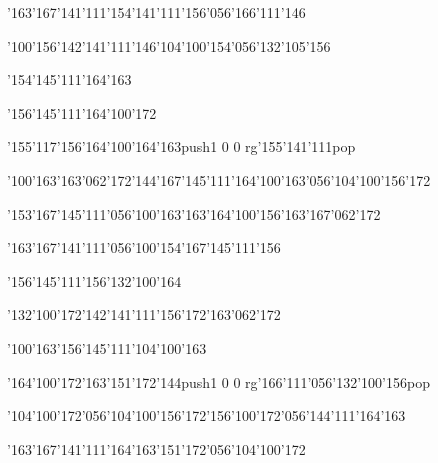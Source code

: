 \null\vfill\ipa\centerline{\enskip\enskip\enskip\enskip\char'163\char'167\char'141\char'111\enskip\enskip\enskip\enskip\char'154\char'141\char'111\char'156\char'056\char'166\char'111\char'146}\medskip\centerline{\enskip\char'100\char'156\enskip\char'142\char'141\char'111\char'146\enskip\char'104\char'100\char'154\char'056\char'132\char'105\char'156}\medskip\centerline{\enskip\enskip\enskip\enskip\enskip\enskip\char'154\char'145\char'111\char'164\char'163\enskip\enskip\enskip\enskip\enskip\enskip\enskip}\medskip\centerline{\enskip\enskip\enskip\enskip\char'156\char'145\char'111\enskip\enskip\enskip\enskip\char'164\char'100\char'172}\medskip\centerline{\enskip\char'155\char'117\char'156\enskip\char'164\char'100\char'164\char'163\enskip\enskip\enskip\enskip\enskip\enskip\pdfcolorstack\match push{1 0 0 rg}\char'155\char'141\char'111\pdfcolorstack\match pop{}\enskip\enskip\enskip\enskip\enskip\enskip}\medskip\centerline{\enskip\char'100\char'163\enskip\enskip\enskip\enskip\char'163\char'062\char'172\char'144\enskip\char'167\char'145\char'111\enskip\char'164\char'100\char'163\char'056\char'104\char'100\char'156\char'172}\medskip\centerline{\enskip\char'153\char'167\char'145\char'111\char'056\char'100\char'163\enskip\enskip\enskip\enskip\enskip\enskip\char'163\char'164\char'100\char'156\enskip\enskip\enskip\enskip\enskip\char'163\char'167\char'062\char'172}\medskip\vfill\footline{\hfil\tt\folio\hfil}\eject
\null\vfill\ipa\centerline{\enskip\enskip\enskip\enskip\char'163\char'167\char'141\char'111\char'056\char'100\char'154\enskip\char'167\char'145\char'111\char'156\enskip\enskip\enskip\enskip}\medskip\centerline{\enskip\enskip\enskip\enskip\char'156\char'145\char'111\char'156\enskip\char'132\char'100\char'164\enskip\enskip\enskip\enskip}\medskip\centerline{\enskip\enskip\char'132\char'100\char'172\enskip\enskip\char'142\char'141\char'111\char'156\char'172\enskip\enskip\enskip\enskip\char'163\char'062\char'172}\medskip\centerline{\enskip\char'100\char'163\enskip\char'156\char'145\char'111\enskip\enskip\enskip\enskip\char'104\char'100\char'163}\medskip\centerline{\enskip\char'164\char'100\char'172\enskip\char'163\char'151\char'172\char'144\enskip\enskip\enskip\enskip\enskip\enskip\enskip\enskip\enskip\enskip\pdfcolorstack\match push{1 0 0 rg}\char'166\char'111\char'056\char'132\char'100\char'156\pdfcolorstack\match pop{}}\medskip\centerline{\enskip\enskip\enskip\enskip\char'104\char'100\char'172\char'056\char'104\char'100\char'156\char'172\enskip\enskip\enskip\enskip\enskip\char'156\char'100\char'172\char'056\char'144\char'111\char'164\char'163}\medskip\centerline{\enskip\char'163\char'167\char'141\char'111\enskip\enskip\enskip\enskip\enskip\enskip\enskip\enskip\enskip\char'164\char'163\char'151\char'172\char'056\char'104\char'100\char'172\enskip\enskip\enskip\enskip\enskip}\medskip\vfill\footline{\hfil\tt\folio\hfil}\eject
